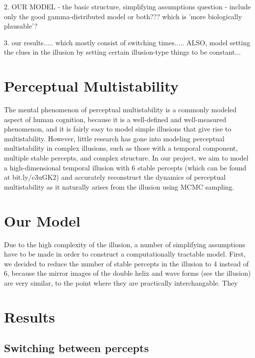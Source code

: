 \documentclass{article} %
\begin{document}
2. OUR MODEL - the basic structure, simplifying assumptions
  question - include only the good gamma-distributed model or both??? which is 'more biologically plausable'?

3. our results..... which mostly consist of switching times..... 
  ALSO, model setting the clues in the illusion by setting certain illusion-type things to be constant...



\section{Perceptual Multistability}
The mental phenomenon of perceptual multistability is a commonly modeled aspect of human cognition, because it is a well-defined and well-measured phenomenon, and it is fairly easy to model simple illusions that give rise to multistability.
However, little research has gone into modeling perceptual multistability in complex illusions, such as those with a temporal component, multiple stable percepts, and complex structure. 
In our project, we aim to model a high-dimensional temporal illusion with 6 stable percepts (which can be found at bit.ly/c3uGK2) and accurately reconstruct the dynamics of perceptual multistability as it naturally arises from the illusion using MCMC sampling. 


\section{Our Model}
Due to the high complexity of the illusion, a number of simplifying assumptions have to be made in order to construct a computationally tractable model. First, we decided to reduce the number of stable percepts in the illusion to 4 instead of 6, because the mirror images of the double helix and wave forms (see the illusion) are very similar, to the point where they are practically interchangable. They 



\section{Results}

\subsection{Switching between percepts}
\end{document}
